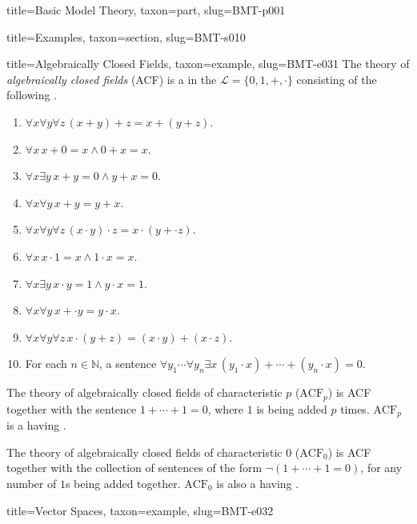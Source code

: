 \documentclass[a4paper]{article}
\begin{document}
\begin{tree}{title={Basic Model Theory}, taxon={part}, slug={BMT-p001}}
\begin{tree}{title={Examples}, taxon={section}, slug={BMT-s010}}
\begin{tree}{title={Algebraically Closed Fields}, taxon={example}, slug={BMT-e031}}
    The theory of \emph{algebraically closed fields} (ACF) is a  in the  \(\mathcal  L= \{ 0,1,+, \cdot \}\)
    consisting of the following .
    \begin{enumerate}
\item{\(\forall  x \forall  y \forall  z \, (x+y)+z=x+(y+z)\).
        }
        \item{\(\forall  x \, x+0=x \land0 +x=x\).
        }
        \item{\(\forall  x \exists  y \, x+y=0 \land  y+x=0\).
        }
        \item{\(\forall  x \forall  y \, x+y=y+x\).
        }
        \item{\(\forall  x \forall  y \forall  z \, (x \cdot  y) \cdot  z=x \cdot  (y+ \cdot  z)\).
        }
        \item{\(\forall  x \, x \cdot1 =x \land1 \cdot  x=x\).
        }
        \item{\(\forall  x \exists  y \, x \cdot  y=1 \land  y \cdot  x=1\).
        }
        \item{\(\forall  x \forall  y \, x+ \cdot  y=y \cdot  x\).
        }
        \item{\(\forall  x \forall  y \forall  z \, x \cdot (y+z)=(x \cdot  y)+(x \cdot  z)\).
        }
        \item{
            For each \(n \in \mathbb  N\), a sentence \(\forall  y_1 \cdots \forall  y_n \exists  x \, (y_1 \cdot  x)+ \cdots +(y_n \cdot  x)=0\).
        }
\end{enumerate}\par{
    The theory of algebraically closed fields of characteristic \(p\) (\(\text {ACF}_p\)) is ACF together with the sentence
    \(1+ \cdots +1=0\), where \(1\) is being added \(p\) times. \(\text {ACF}_p\) is a  having
    .
}\par{
    The theory of algebraically closed fields of characteristic \(0\) (\(\text {ACF}_0\)) is ACF together with the collection of sentences
    of the form \(\neg (1+ \cdots +1=0)\), for any number of \(1\)s being added together. \(\text {ACF}_0\) is also a
     having .
}
\end{tree}

\begin{tree}{title={Vector Spaces}, taxon={example}, slug={BMT-e032}}


\end{tree}
\end{tree}
\end{tree}
\end{document}
